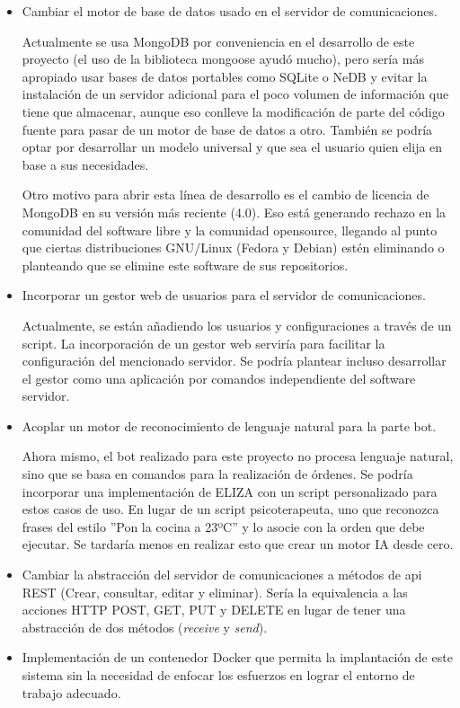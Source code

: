 \documentclass[spanish,12pt, a4paper, twoside]{paper}
\begin{document}
\begin{itemize}
\item Cambiar el motor de base de datos usado en el servidor de comunicaciones. 

Actualmente se usa MongoDB por conveniencia en el desarrollo de este proyecto (el uso de la biblioteca mongoose ayudó mucho), pero sería más apropiado usar bases de datos portables como SQLite o NeDB  y evitar la instalación de un servidor adicional para el poco volumen de información que tiene que almacenar, aunque eso conlleve la modificación de parte del código fuente para pasar de un motor de base de datos a otro. También se podría optar por desarrollar un modelo universal y que sea el usuario quien elija en base a sus necesidades.

Otro motivo para abrir esta línea de desarrollo es el cambio de licencia de MongoDB en su versión más reciente (4.0). Eso está generando rechazo en la comunidad del software libre y la comunidad opensource, llegando al punto que ciertas distribuciones GNU/Linux (Fedora y Debian) estén eliminando o planteando que se elimine este software de sus repositorios. \cite{MongoDBLicense} \cite{MongoDBRemoveRequest}

\item Incorporar un gestor web de usuarios para el servidor de comunicaciones.

Actualmente, se están añadiendo los usuarios y configuraciones a través de un script. La incorporación de un gestor web serviría para facilitar la configuración del mencionado servidor. Se podría plantear incluso desarrollar el gestor como una aplicación por comandos independiente del software servidor.

\item Acoplar un motor de reconocimiento de lenguaje natural para la parte bot.

Ahora mismo, el bot realizado para este proyecto no procesa lenguaje natural, sino que se basa en comandos para la realización de órdenes. Se podría incorporar una implementación de ELIZA con un script personalizado para estos casos de uso. En lugar de un script psicoterapeuta, uno que reconozca frases del estilo ''Pon la cocina a 23ºC'' y lo asocie con la orden que debe ejecutar. Se tardaría menos en realizar esto que crear un motor IA desde cero.

\item Cambiar la abstracción del servidor de comunicaciones a métodos de api REST (Crear, consultar, editar y eliminar). Sería la equivalencia a las acciones HTTP POST, GET, PUT y DELETE en lugar de tener una abstracción de dos métodos (\emph{receive} y \emph{send}).

\item Implementación de un contenedor Docker que permita la implantación de este sistema sin la necesidad de enfocar los esfuerzos en lograr el entorno de trabajo adecuado.
\end{itemize}
\end{document}
